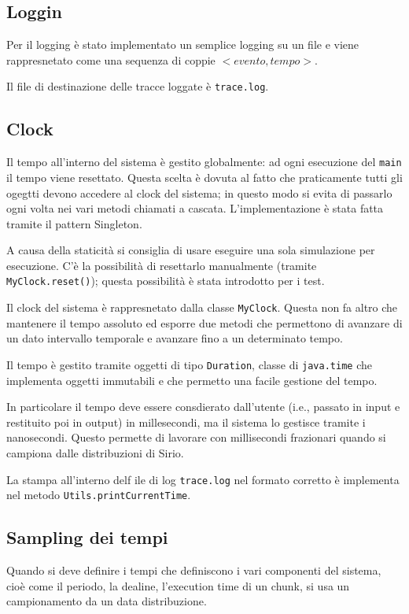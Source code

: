 \subsection{Loggin}
Per il logging è stato implementato un semplice logging su un file e viene rappresnetato come una sequenza di coppie $<evento,tempo>$.

Il file di destinazione delle tracce loggate è \texttt{trace.log}.

\subsection{Clock}
Il tempo all'interno del sistema è gestito globalmente: ad ogni esecuzione del \texttt{main} il tempo viene resettato. Questa scelta è dovuta al fatto che praticamente tutti gli ogegtti devono accedere al clock del sistema; in questo modo si evita di passarlo ogni volta nei vari metodi chiamati a cascata. L'implementazione è stata fatta tramite il pattern Singleton.

A causa della staticità si consiglia di usare eseguire una sola simulazione per esecuzione. C'è la possibilità di resettarlo manualmente (tramite \texttt{MyClock.reset()}); questa possibilità è stata introdotto per i test.

Il clock del sistema è rappresnetato dalla classe \texttt{MyClock}. Questa non fa altro che mantenere il tempo assoluto ed esporre due metodi che permettono di avanzare di un dato intervallo temporale e avanzare fino a un determinato tempo.

\myskip

Il tempo è gestito tramite oggetti di tipo \texttt{Duration}, classe di \texttt{java.time} che implementa oggetti immutabili e che permetto una facile gestione del tempo.

In particolare il tempo deve essere consdierato dall'utente (i.e., passato in input e restituito poi in output) in millesecondi, ma il sistema lo gestisce tramite i nanosecondi. Questo permette di lavorare con millisecondi frazionari quando si campiona dalle distribuzioni di Sirio.

La stampa all'interno delf ile di log \texttt{trace.log} nel formato corretto è implementa nel metodo \texttt{Utils.printCurrentTime}.

\subsection{Sampling dei tempi}
Quando si deve definire i tempi che definiscono i vari componenti del sistema, cioè come il periodo, la dealine, l'execution time di un chunk, si usa un campionamento da un data distribuzione.

